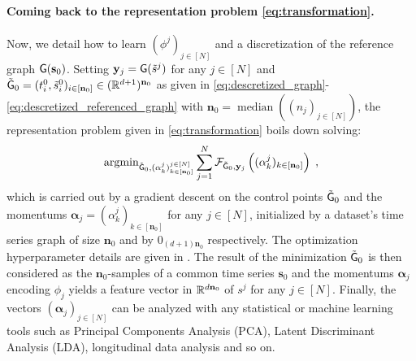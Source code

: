      \paragraph{Coming back to the representation problem \eqref{eq:transformation}.}
     Now, we detail how to learn $(\phi^j)_{j\in[N]}$ and a discretization of the reference graph $\mathsf{G}(\mathbf{s}_0)$.
      Setting $\mathbf{y}_j=\mathsf{G}(\tilde{s}^j)$ for any $j\in[N]$ and $\tilde{\mathsf{G}}_0=(t_i^0,\tilde{s}^0_i)_{i\in[\mathbf{n}_0]}\in (\mathbb{R}^{d+1})^{\mathbf{n}_0} $ as given in \eqref{eq:descretized_graph}-\eqref{eq:descretized_referenced_graph} with $\mathbf{n}_0=\operatorname{median}((n_j)_{j\in[N]})$, the representation problem given in \eqref{eq:transformation} boils down solving:
      \begin{equation}
        \label{eq:general_optimization_problem}
        \operatorname{argmin}_{\tilde{\mathsf{G}}_0,(\alpha_k^j)_{k\in [\mathbf{n}_0]}^{j\in[N]}} \sum_{j=1}^N \mathcal{F}_{\tilde{\mathsf{G}}_0,\mathbf{y}_j}\left((\alpha_k^j)_{k\in [\mathbf{n}_0]}\right)\; ,
      \end{equation}
      which is carried out by a gradient descent on the control points $\tilde{\mathsf{G}}_0$ and the momentums $\mathbf{\alpha}_j=(\alpha_k^j)_{k\in [\mathbf{n}_0]}$ for any $j\in[N]$, initialized by a dataset's time series graph of size $\mathbf{n}_0$ and by $0_{(d+1)\mathbf{n}_0}$ respectively.
      The optimization hyperparameter details are given in .
     The result of the minimization $\tilde{\mathsf{G}}_0$ is then considered as the $\mathbf{n}_0$-samples of a common time series $\mathbf{s}_0$ and the momentums $\mathbf{\alpha}_j$ encoding $\phi_j$ yields a feature vector in $\mathbb{R}^{d \mathbf{n}_0} $ of $s^j$ for any $j\in[N]$.
     Finally, the vectors $(\mathbf{\alpha}_j)_{j\in[N]}$ can be analyzed with any statistical or machine learning tools such as Principal Components Analysis (PCA), Latent Discriminant Analysis (LDA), longitudinal data analysis and so on.


